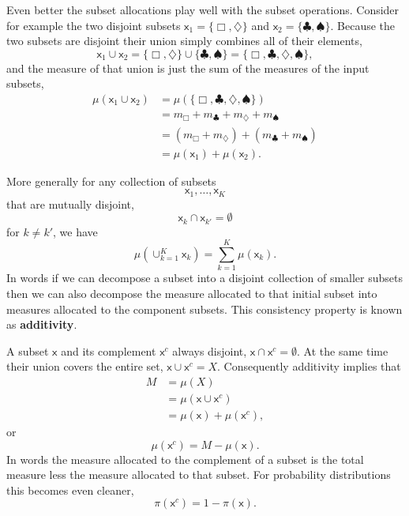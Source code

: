\documentclass[
  letterpaper,
  DIV=11,
  numbers=noendperiod]{scrartcl}
\begin{document}
Even better the subset allocations play well with the subset operations.
Consider for example the two disjoint subsets
\(\mathsf{x}_{1} = \{ \Box, \diamondsuit \}\) and
\(\mathsf{x}_{2} = \{ \clubsuit, \spadesuit \}\). Because the two
subsets are disjoint their union simply combines all of their elements,
\[
\mathsf{x}_{1} \cup \mathsf{x}_{2}
=
\{ \Box, \diamondsuit \} \cup \{ \clubsuit, \spadesuit \}
=
\{ \Box, \clubsuit, \diamondsuit, \spadesuit \},
\] and the measure of that union is just the sum of the measures of the
input subsets, \begin{align*}
\mu ( \mathsf{x}_{1} \cup \mathsf{x}_{2} )
&=
\mu ( \{ \Box, \clubsuit, \diamondsuit, \spadesuit \} )
\\
&=
m_{\Box} + m_{\clubsuit} + m_{\diamondsuit} + m_{\spadesuit}
\\
&=
( m_{\Box} + m_{\diamondsuit} ) + ( m_{\clubsuit} + m_{\spadesuit} )
\\
&=
\mu( \mathsf{x}_{1} ) + \mu( \mathsf{x}_{2} ).
\end{align*}

More generally for any collection of subsets \[
\mathsf{x}_{1}, \ldots, \mathsf{x}_{K}
\] that are mutually disjoint, \[
\mathsf{x}_{k} \cap \mathsf{x}_{k'} = \emptyset
\] for \(k \ne k'\), we have \[
\mu ( \cup_{k = 1}^{K} \mathsf{x}_{k} )
=
\sum_{k = 1}^{K} \mu ( \mathsf{x}_{k} ).
\] In words if we can decompose a subset into a disjoint collection of
smaller subsets then we can also decompose the measure allocated to that
initial subset into measures allocated to the component subsets. This
consistency property is known as \textbf{additivity}.

A subset \(\mathsf{x}\) and its complement \(\mathsf{x}^{c}\) always
disjoint, \(\mathsf{x} \cap \mathsf{x}^{c} = \emptyset\). At the same
time their union covers the entire set,
\(\mathsf{x} \cup \mathsf{x}^{c} = X\). Consequently additivity implies
that \begin{align*}
M
&=
\mu (X)
\\
&=
\mu ( \mathsf{x} \cup \mathsf{x}^{c} )
\\
&= \mu ( \mathsf{x} ) + \mu ( \mathsf{x}^{c} ),
\end{align*} or \[
\mu ( \mathsf{x}^{c} ) = M - \mu ( \mathsf{x} ).
\] In words the measure allocated to the complement of a subset is the
total measure less the measure allocated to that subset. For probability
distributions this becomes even cleaner, \[
\pi ( \mathsf{x}^{c} ) = 1 - \pi ( \mathsf{x} ).
\]
\end{document}
